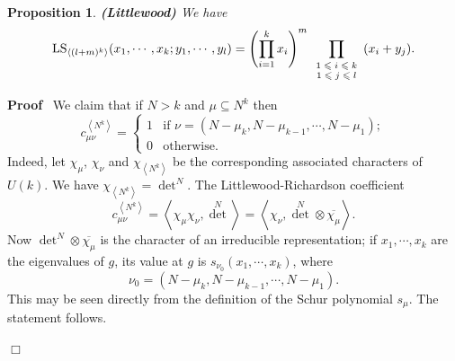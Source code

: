 \documentclass[11pt]{amsart}
\newcommand{\tmop}[1]{\ensuremath{\operatorname{#1}}}
\newtheorem{proposition}{Proposition}
\renewenvironment{proof}{
\noindent\textbf{Proof}\ }{\hspace*{\fill}
\begin{math}\Box\end{math}\medskip}
\newcommand{\dueto}[1]{\textup{\textbf{(#1) }}}
\newcommand{\tmscript}[1]{\text{\scriptsize $#1$}}
\begin{document}
\begin{proposition}
\label{littlewoodsquarecase} {\dueto{Littlewood}}We have
\[ \tmop{LS}_{\left\langle ( l + m )^k \right\rangle} ( x_1, \cdots, x_k ;
    y_1, \cdots, y_l ) = \left( \prod_{i = 1}^k x_i \right)^m
    \prod_{\tmscript{\begin{array}{c}
      1 \leqslant i \leqslant k\\
      1 \leqslant j \leqslant l
    \end{array}}} ( x_i + y_j ) . \]
\end{proposition}



\begin{proof}
We claim that if $N > k$ and $\mu \subseteq N^k$ then
\[ c^{\left\langle N^k \right\rangle}_{\mu \nu} = \left\{\begin{array}{ll}
      1 & \text{if $\nu = ( N - \mu_k, N - \mu_{k - 1}, \cdots, N - \mu_1 )$}
      ;\\
      0 & \text{otherwise.}
    \end{array}\right. \]
Indeed, let $\chi_{\mu}$, $\chi_{\nu}$ and $\chi_{\left\langle N^k
\right\rangle}$ be the corresponding associated characters of $U (
k )$. We have $\chi_{\left\langle N^k \right\rangle} = {\det}^N$.
The Littlewood-Richardson coefficient
\[ c^{\left\langle N^k \right\rangle}_{\mu \nu} = \left\langle \chi_{\mu}
    \chi_{\nu}, {\det}^N \right\rangle = \left\langle \chi_{\nu}, {\det}^N
    \otimes \overline{\chi_{\mu}} \right\rangle . \]
Now ${\det}^N \otimes \overline{\chi_{\mu}}$ is the character of
an irreducible representation; if $x_1, \cdots, x_k$ are the
eigenvalues of $g$, its value at $g$ is $s_{\nu_0} ( x_1, \cdots,
x_k )$, where
\[ \nu_0 = ( N - \mu_k, N - \mu_{k - 1}, \cdots, N - \mu_1 ) . \]
This may be seen directly from the definition of the Schur
polynomial $s_{\mu}$. The statement follows.


\end{proof}
\end{document}
